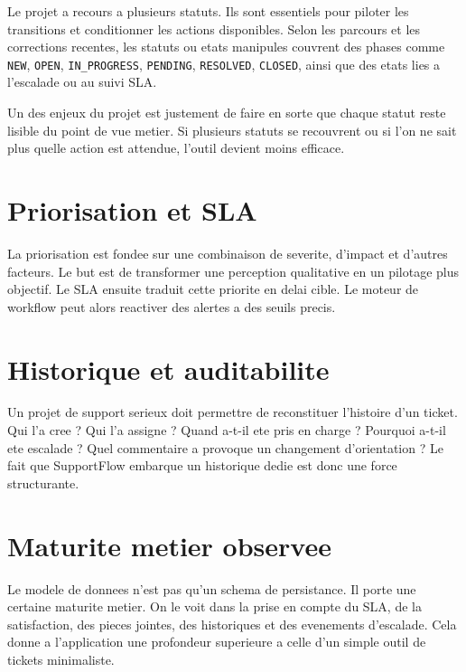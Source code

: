 Le projet a recours a plusieurs statuts. Ils sont essentiels pour piloter les transitions et conditionner les actions disponibles. Selon les parcours et les corrections recentes, les statuts ou etats manipules couvrent des phases comme \texttt{NEW}, \texttt{OPEN}, \texttt{IN\_PROGRESS}, \texttt{PENDING}, \texttt{RESOLVED}, \texttt{CLOSED}, ainsi que des etats lies a l'escalade ou au suivi SLA.

Un des enjeux du projet est justement de faire en sorte que chaque statut reste lisible du point de vue metier. Si plusieurs statuts se recouvrent ou si l'on ne sait plus quelle action est attendue, l'outil devient moins efficace.

\section{Priorisation et SLA}

La priorisation est fondee sur une combinaison de severite, d'impact et d'autres facteurs. Le but est de transformer une perception qualitative en un pilotage plus objectif. Le SLA ensuite traduit cette priorite en delai cible. Le moteur de workflow peut alors reactiver des alertes a des seuils precis.

\section{Historique et auditabilite}

Un projet de support serieux doit permettre de reconstituer l'histoire d'un ticket. Qui l'a cree ? Qui l'a assigne ? Quand a-t-il ete pris en charge ? Pourquoi a-t-il ete escalade ? Quel commentaire a provoque un changement d'orientation ? Le fait que SupportFlow embarque un historique dedie est donc une force structurante.

\section{Maturite metier observee}

Le modele de donnees n'est pas qu'un schema de persistance. Il porte une certaine maturite metier. On le voit dans la prise en compte du SLA, de la satisfaction, des pieces jointes, des historiques et des evenements d'escalade. Cela donne a l'application une profondeur superieure a celle d'un simple outil de tickets minimaliste.


